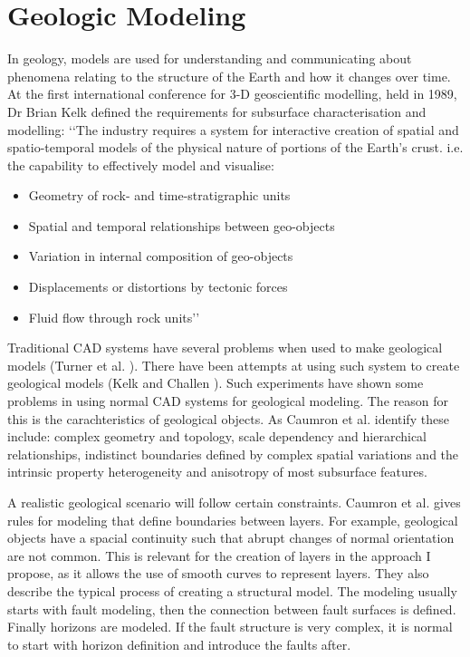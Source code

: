 \documentclass[a4paper,12pt]{report}
\begin{document}
\section{Geologic Modeling}
In geology, models are used for understanding and communicating about phenomena relating to the structure of the Earth and how it changes over time. At the first international conference for 3-D geoscientific modelling, held in 1989, Dr Brian Kelk defined the requirements for subsurface characterisation and modelling:
‘‘The industry requires a system for interactive creation
of spatial and spatio-temporal models of the physical
nature of portions of the Earth’s crust. i.e. the
capability to effectively model and visualise:
\begin{itemize}
 \item Geometry of rock- and time-stratigraphic units
 \item Spatial and temporal relationships between geo-objects
 \item Variation in internal composition of geo-objects
 \item Displacements or distortions by tectonic forces
 \item Fluid flow through rock units’’ \cite{turner1992three}
\end{itemize}

Traditional CAD systems have several problems when used to make geological models (Turner et al. \cite{turner2006challenges}). There have been attempts at using such system to create geological models (Kelk and Challen \cite{kelk1992experiments}). Such experiments have shown some problems in using normal CAD systems for geological modeling. The reason for this is the carachteristics of geological objects. As Caumron et al. \cite{caumon2009surface} identify these include: complex geometry and topology, scale dependency and hierarchical relationships, indistinct boundaries defined by complex spatial variations and the intrinsic property heterogeneity and anisotropy of most subsurface features. 

A realistic geological scenario will follow certain constraints.  Caumron et al. gives rules for modeling that define boundaries between layers. For example, geological objects have a spacial continuity such that abrupt changes of normal orientation are not common. This is relevant for the creation of layers in the approach I propose, as it allows the use of smooth curves to represent layers. They also describe  the typical process of creating a structural model. The modeling usually starts with fault modeling, then the connection between fault surfaces is defined. Finally horizons are modeled. If the fault structure is very complex, it is normal to start with horizon definition and introduce the faults after.
\end{document}
